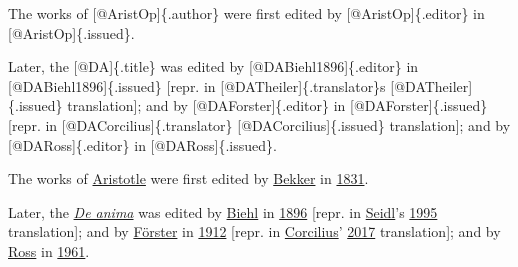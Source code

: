 \documentclass[
  12pt,
  a4paper,
  oneside]{scrbook}
\newenvironment{Shaded}{\begin{snugshade}}{\end{snugshade}}
\newcommand{\CommentTok}[1]{\textcolor[rgb]{0.37,0.37,0.37}{#1}}
\newcommand{\NormalTok}[1]{\textcolor[rgb]{0.00,0.23,0.31}{#1}}
\newcommand{\OtherTok}[1]{\textcolor[rgb]{0.00,0.23,0.31}{#1}}
\begin{document}
\protect\hypertarget{scriv29}{}{}

\begin{Shaded}
\begin{Highlighting}[numbers=left,,]
\NormalTok{The works of }\CommentTok{[}\OtherTok{@AristOp}\CommentTok{]}\NormalTok{\{.author\} were first edited by }\CommentTok{[}\OtherTok{@AristOp}\CommentTok{]}\NormalTok{\{.editor\} in }\CommentTok{[}\OtherTok{@AristOp}\CommentTok{]}\NormalTok{\{.issued\}.  }

\NormalTok{Later, the }\CommentTok{[}\OtherTok{@DA}\CommentTok{]}\NormalTok{\{.title\} was edited by }\CommentTok{[}\OtherTok{@DABiehl1896}\CommentTok{]}\NormalTok{\{.editor\} in }\CommentTok{[}\OtherTok{@DABiehl1896}\CommentTok{]}\NormalTok{\{.issued\} }\CommentTok{[}\OtherTok{repr. in [@DATheiler]\{.translator\}\textquotesingle{}s [@DATheiler]\{.issued\} translation}\CommentTok{]}\NormalTok{; and by }\CommentTok{[}\OtherTok{@DAForster}\CommentTok{]}\NormalTok{\{.editor\} in }\CommentTok{[}\OtherTok{@DAForster}\CommentTok{]}\NormalTok{\{.issued\} }\CommentTok{[}\OtherTok{repr. in [@DACorcilius]\{.translator\}\textquotesingle{} [@DACorcilius]\{.issued\} translation}\CommentTok{]}\NormalTok{; and by }\CommentTok{[}\OtherTok{@DARoss}\CommentTok{]}\NormalTok{\{.editor\} in }\CommentTok{[}\OtherTok{@DARoss}\CommentTok{]}\NormalTok{\{.issued\}.}
\end{Highlighting}
\end{Shaded}

The works of
\protect\hypertarget{cite_57}{}{\label{cite_57}\protect\hyperlink{ref-AristOp}{Aristotle}}
were first edited by
\protect\hypertarget{cite_58}{}{\label{cite_58}\protect\hyperlink{ref-AristOp}{Bekker}}
in
\protect\hypertarget{cite_59}{}{\label{cite_59}\protect\hyperlink{ref-AristOp}{1831}}.

Later, the
\protect\hypertarget{cite_60}{}{\label{cite_60}\protect\hyperlink{ref-DA}{\emph{De anima}}}
was edited by
\protect\hypertarget{cite_61}{}{\label{cite_61}\protect\hyperlink{ref-DABiehl1896}{Biehl}}
in
\protect\hypertarget{cite_62}{}{\label{cite_62}\protect\hyperlink{ref-DABiehl1896}{1896}}
{[}repr. in
\protect\hypertarget{cite_63}{}{\label{cite_63}\protect\hyperlink{ref-DATheiler}{Seidl}}'s
\protect\hypertarget{cite_64}{}{\label{cite_64}\protect\hyperlink{ref-DATheiler}{1995}}
translation{]}; and by
\protect\hypertarget{cite_65}{}{\label{cite_65}\protect\hyperlink{ref-DAForster}{Förster}}
in
\protect\hypertarget{cite_66}{}{\label{cite_66}\protect\hyperlink{ref-DAForster}{1912}}
{[}repr. in
\protect\hypertarget{cite_67}{}{\label{cite_67}\protect\hyperlink{ref-DACorcilius}{Corcilius}}'
\protect\hypertarget{cite_68}{}{\label{cite_68}\protect\hyperlink{ref-DACorcilius}{2017}}
translation{]}; and by
\protect\hypertarget{cite_69}{}{\label{cite_69}\protect\hyperlink{ref-DARoss}{Ross}}
in
\protect\hypertarget{cite_70}{}{\label{cite_70}\protect\hyperlink{ref-DARoss}{1961}}.
\end{document}
